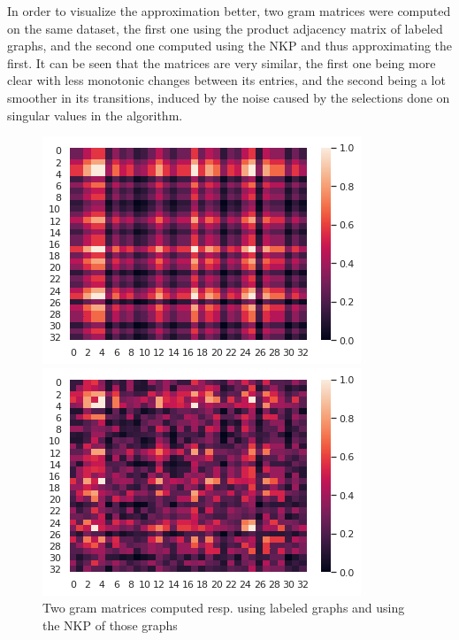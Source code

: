 \documentclass{article}
\theoremstyle{definition}
\begin{document}
In order to visualize the approximation better, two gram matrices were computed on the same dataset, the first one using the product adjacency matrix of labeled graphs, and the second one computed using the NKP and thus approximating the first. It can be seen that the matrices are very similar, the first one being more clear with less monotonic changes between its entries, and the second being a lot smoother in its transitions, induced by the noise caused by the selections done on singular values in the algorithm.
\begin{figure}[!htb]
	\begin{multicols}{2}
		\includegraphics[width=\linewidth]{data/nkp/gram.png}\par
		\includegraphics[width=\linewidth]{data/nkp/gram_approx.png}\par
	\end{multicols}
\caption{Two gram matrices computed resp. using labeled graphs and using the NKP of those graphs}
\end{figure}
\end{document}
